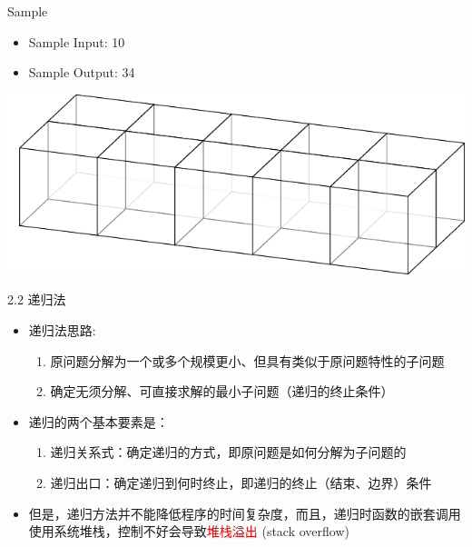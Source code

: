 \begin{frame}
    \begin{exampleblock}{Sample}
        \begin{itemize}
            \item Sample Input: 10
            \item Sample Output: 34
        \end{itemize}
    \end{exampleblock}
    \vfill
    \includegraphics{fig/2-1.pdf}
\end{frame}
\begin{frame}{2.2 递归法}
    \begin{itemize}
        \item 递归法思路:
        \begin{enumerate}
            \item 原问题分解为一个或多个规模更小、但具有类似于原问题特性的子问题
            \item 确定无须分解、可直接求解的最小子问题（递归的终止条件）
        \end{enumerate}
        \item 递归的两个基本要素是：
        \begin{enumerate}
            \item 递归关系式：确定递归的方式，即原问题是如何分解为子问题的
            \item 递归出口：确定递归到何时终止，即递归的终止（结束、边界）条件
        \end{enumerate}
        \item 但是，递归方法并不能降低程序的时间复杂度，而且，递归时函数的嵌套调用使用系统堆栈，控制不好会导致\textcolor{red}{堆栈溢出} (stack overflow)
    \end{itemize}
\end{frame}
